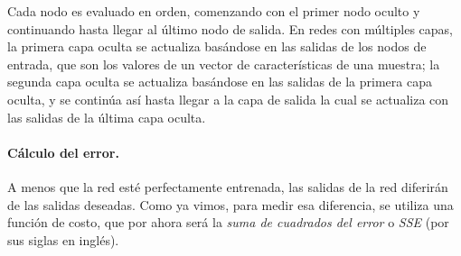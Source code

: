 Cada nodo es evaluado en orden, comenzando con el primer nodo oculto
y continuando hasta llegar al último nodo de salida. En 
redes con múltiples capas, la primera capa oculta se actualiza basándose en las
salidas de los nodos de entrada, que son los valores de un vector de características 
de una muestra; la segunda capa oculta se actualiza basándose en las
salidas de la primera capa oculta, y se continúa así hasta llegar a la capa de salida
la cual se actualiza con las salidas de la última capa oculta.

















\paragraph{Cálculo del error.}

A menos que la red esté perfectamente entrenada, las salidas de la red diferirán de
las salidas deseadas. Como ya vimos, para medir esa diferencia, se utiliza una función de costo, 
que por ahora será la \textit{suma de cuadrados del error} o \textit{SSE} (por sus 
siglas en inglés).

